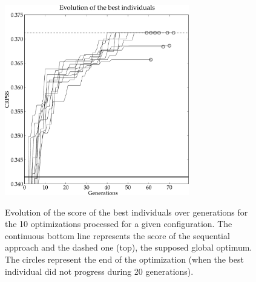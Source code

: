 \documentclass{ametsoc}
\begin{document}
\begin{figure}[t]
	\begin{center}
		\noindent\includegraphics[width=19pc,angle=0]{fig02.pdf}\\
	\end{center}
	\caption{Evolution of the score of the best individuals over generations for the 10 optimizations processed for a given configuration. The continuous bottom line represents the score of the sequential approach and the dashed one (top), the supposed global optimum. The circles represent the end of the optimization (when the best individual did not progress during 20 generations).}
	\label{fig:gas_evolution_good}
\end{figure}
\end{document}
